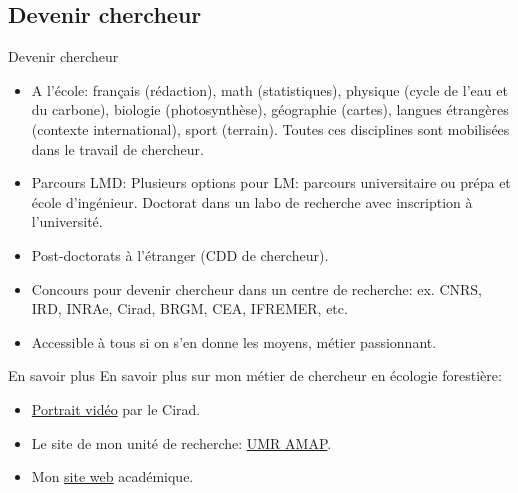 \documentclass[10pt,table,dvipsnames,compress]{beamer}
\begin{document}
\subsection{Devenir chercheur}
\label{sec:org2e3d176}

\begin{frame}[label={sec:orge597651}]{Devenir chercheur}
\begin{itemize}
\item A l'école: français (rédaction), math (statistiques), physique (cycle de l'eau et du carbone), biologie (photosynthèse), géographie (cartes), langues étrangères (contexte international), sport (terrain). Toutes ces disciplines sont mobilisées dans le travail de chercheur.
\item Parcours LMD: Plusieurs options pour LM: parcours universitaire ou prépa et école d'ingénieur. Doctorat dans un labo de recherche avec inscription à l'université.
\item Post-doctorats à l'étranger (CDD de chercheur).
\item Concours pour devenir chercheur dans un centre de recherche: ex. CNRS, IRD, INRAe, Cirad, BRGM, CEA, IFREMER, etc.
\item Accessible à tous si on s'en donne les moyens, métier passionnant.
\end{itemize}
\end{frame}
\begin{frame}[label={sec:org2141776}]{En savoir plus}
En savoir plus sur mon métier de chercheur en écologie forestière:

\begin{itemize}
\item \href{https://www.youtube.com/watch?v=4kxdB6Jd4Nw}{Portrait vidéo} par le Cirad.
\item Le site de mon unité de recherche: \href{https://amap.cirad.fr}{UMR AMAP}.
\item Mon \href{https://ecology.ghislainv.fr}{site web} académique.
\end{itemize}
\end{frame}
\end{document}
